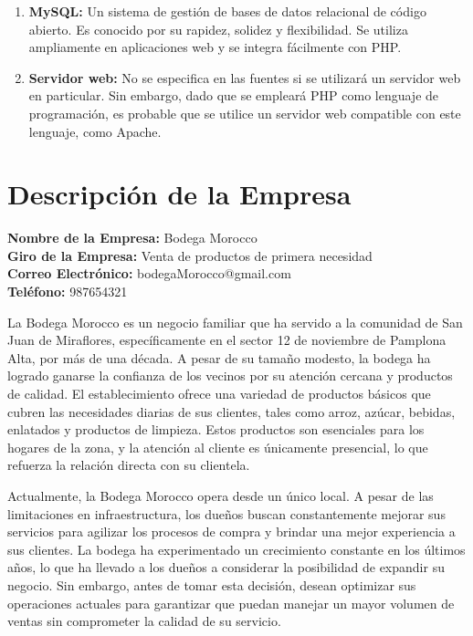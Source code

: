 \documentclass{article}
\begin{document}
\begin{enumerate}
\begin{itemize}
\begin{enumerate}
    \item \textbf{MySQL:} Un sistema de gestión de bases de datos relacional de código abierto. Es conocido por su rapidez, solidez y flexibilidad. Se utiliza ampliamente en aplicaciones web y se integra fácilmente con PHP.
    \item \textbf{Servidor web:} No se especifica en las fuentes si se utilizará un servidor web en particular. Sin embargo, dado que se empleará PHP como lenguaje de programación, es probable que se utilice un servidor web compatible con este lenguaje, como Apache.
  \end{enumerate}
\end{itemize}


\end{enumerate}

\newpage
\section{Descripción de la Empresa}

  \begin{spacing}{1.5}
    \noindent
    \textbf{Nombre de la Empresa:} Bodega Morocco \\
    \textbf{Giro de la Empresa:} Venta de productos de primera necesidad \\
    \textbf{Correo Electrónico:} bodegaMorocco@gmail.com \\
    \textbf{Teléfono:} 987654321
  \end{spacing}

  La Bodega Morocco es un negocio familiar que ha servido a la comunidad de San Juan de Miraflores, específicamente en el sector 12 de noviembre de Pamplona Alta, por más de una década. A pesar de su tamaño modesto, la bodega ha logrado ganarse la confianza de los vecinos por su atención cercana y productos de calidad. El establecimiento ofrece una variedad de productos básicos que cubren las necesidades diarias de sus clientes, tales como arroz, azúcar, bebidas, enlatados y productos de limpieza. Estos productos son esenciales para los hogares de la zona, y la atención al cliente es únicamente presencial, lo que refuerza la relación directa con su clientela.

  Actualmente, la Bodega Morocco opera desde un único local. A pesar de las limitaciones en infraestructura, los dueños buscan constantemente mejorar sus servicios para agilizar los procesos de compra y brindar una mejor experiencia a sus clientes. La bodega ha experimentado un crecimiento constante en los últimos años, lo que ha llevado a los dueños a considerar la posibilidad de expandir su negocio. Sin embargo, antes de tomar esta decisión, desean optimizar sus operaciones actuales para garantizar que puedan manejar un mayor volumen de ventas sin comprometer la calidad de su servicio.
\end{document}
